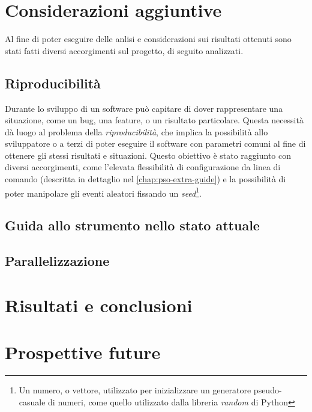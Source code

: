 \section{Considerazioni aggiuntive}
Al fine di poter eseguire delle anlisi e considerazioni sui risultati ottenuti sono stati fatti diversi accorgimenti sul progetto, di seguito analizzati.

\subsection{Riproducibilità}
Durante lo sviluppo di un software può capitare di dover rappresentare una situazione, come un bug, una feature, o un risultato particolare. Questa necessità dà luogo al problema della \textit{riproducibilità}, che implica la possibilità allo sviluppatore o a terzi di poter eseguire il software con parametri comuni al fine di ottenere gli stessi risultati e situazioni. Questo obiettivo è stato raggiunto con diversi accorgimenti, come l'elevata flessibilità di configurazione da linea di comando (descritta in dettaglio nel \autoref{chap:pso-extra-guide}) e la possibilità di poter manipolare gli eventi aleatori fissando un \textit{seed}\footnote{Un numero, o vettore, utilizzato per inizializzare un generatore pseudo-casuale di numeri, come quello utilizzato dalla libreria \textit{random} di Python}.

\subsection{Guida allo strumento nello stato attuale}
\label{chap:pso-extra-guide}

\subsection{Parallelizzazione}

\section{Risultati e conclusioni}

\section{Prospettive future}
